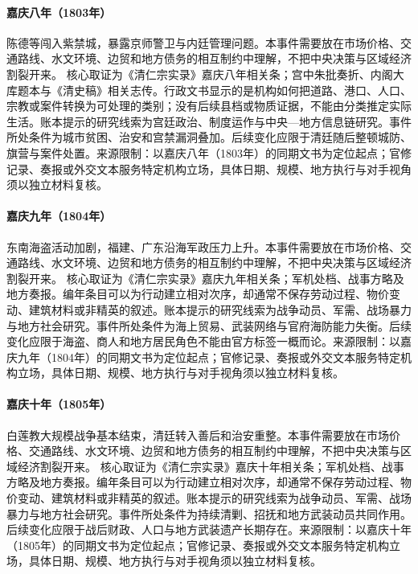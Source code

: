 \hypertarget{civic:EQ-1803-FORBIDDEN-CITY-ATTACK}{}\paragraph{嘉庆八年（1803年）}陈德等闯入紫禁城，暴露京师警卫与内廷管理问题。本事件需要放在市场价格、交通路线、水文环境、边贸和地方债务的相互制约中理解，不把中央决策与区域经济割裂开来。 核心取证为《清仁宗实录》嘉庆八年相关条；宫中朱批奏折、内阁大库题本与《清史稿》相关志传。行政文书显示的是机构如何把道路、港口、人口、宗教或案件转换为可处理的类别；没有后续县档或物质证据，不能由分类推定实际生活。账本提示的研究线索为宫廷政治、制度运作与中央—地方信息链研究。事件所处条件为城市贫困、治安和宫禁漏洞叠加。后续变化应限于清廷随后整顿城防、旗营与案件处置。来源限制：以嘉庆八年（1803年）的同期文书为定位起点；官修记录、奏报或外交文本服务特定机构立场，具体日期、规模、地方执行与对手视角须以独立材料复核。
\hypertarget{civic:EQ-1804-COASTAL-PIRACY}{}\paragraph{嘉庆九年（1804年）}东南海盗活动加剧，福建、广东沿海军政压力上升。本事件需要放在市场价格、交通路线、水文环境、边贸和地方债务的相互制约中理解，不把中央决策与区域经济割裂开来。 核心取证为《清仁宗实录》嘉庆九年相关条；军机处档、战事方略及地方奏报。编年条目可以为行动建立相对次序，却通常不保存劳动过程、物价变动、建筑材料或非精英的叙述。账本提示的研究线索为战争动员、军需、战场暴力与地方社会研究。事件所处条件为海上贸易、武装网络与官府海防能力失衡。后续变化应限于海盗、商人和地方居民角色不能由官方标签一概而论。来源限制：以嘉庆九年（1804年）的同期文书为定位起点；官修记录、奏报或外交文本服务特定机构立场，具体日期、规模、地方执行与对手视角须以独立材料复核。
\hypertarget{civic:EQ-1805-WHITE-LOTUS-WAR-END}{}\paragraph{嘉庆十年（1805年）}白莲教大规模战争基本结束，清廷转入善后和治安重整。本事件需要放在市场价格、交通路线、水文环境、边贸和地方债务的相互制约中理解，不把中央决策与区域经济割裂开来。 核心取证为《清仁宗实录》嘉庆十年相关条；军机处档、战事方略及地方奏报。编年条目可以为行动建立相对次序，却通常不保存劳动过程、物价变动、建筑材料或非精英的叙述。账本提示的研究线索为战争动员、军需、战场暴力与地方社会研究。事件所处条件为持续清剿、招抚和地方武装动员共同作用。后续变化应限于战后财政、人口与地方武装遗产长期存在。来源限制：以嘉庆十年（1805年）的同期文书为定位起点；官修记录、奏报或外交文本服务特定机构立场，具体日期、规模、地方执行与对手视角须以独立材料复核。
